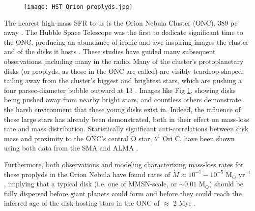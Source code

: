 \begin{figure}[t!]
\centering
  \texttt{[image: HST\_Orion\_proplyds.jpg]}
  \label{fig:HST_ONC}
\end{figure}



The nearest high-mass SFR to us is the Orion Nebula Cluster (ONC), 389 pc away \citep{GaiaCollaboration2018}. The Hubble Space Telescope was the first to dedicate significant time to the ONC, producing an abundance of iconic and awe-inspiring images the cluster and of the disks it hosts \citep{Ricci2008}. These studies have guided many subsequent observations, including many in the radio. Many of the cluster's protoplanetary disks (or proplyds, as those in the ONC are called) are visibly teardrop-shaped, tailing away from the cluster's biggest and brightest stars, which are pushing a four parsec-diameter bubble outward at 13 \kms \citep{Pabst2019}. Images like Fig \ref{fig:HST_ONC}, showing disks being pushed away from nearby bright stars, and countless others demonstrate the harsh environment that these young disks exist in. Indeed, the influence of these large stars has already been demonstrated, both in their effect on mass-loss rate and mass distribution. Statistically significant anti-correlations between disk mass and proximity to the ONC's central O star, $\theta^1$ Ori C, have been shown using both data from the SMA \citep{MannWilliams2009} and ALMA \citep{Mann2014,Ansdell2017,Eisner2018}.


Furthermore, both observations \citep{HenneyODell1999} and modeling \citep{Haworth2016} characterizing mass-loss rates for these proplyds in the Orion Nebula have found rates of $\dot{M} \approx 10^{-7}-10^{-5}$ M$_{\odot}$ yr$^{-1}$, implying that a typical disk (i.e. one of MMSN-scale, or $\sim0.01$ M$_{\odot}$) should be fully dispersed before giant planets could form \citep{Hubickyj2005} and before they could reach the inferred age of the disk-hosting stars in the ONC of $\approx$ 2 Myr \citep{Reggiani2011}.


